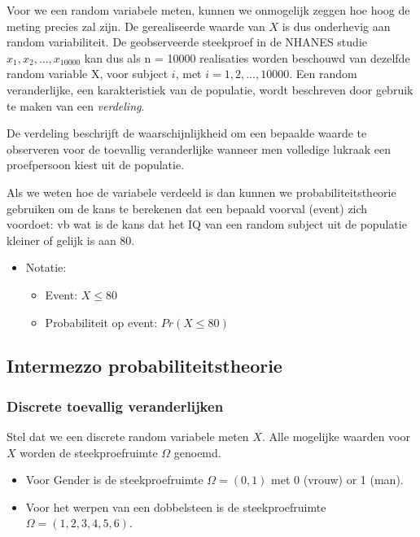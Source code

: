\documentclass[
  12pt,dutch,coursenotes]{book}
\providecommand{\tightlist}{%
  \setlength{\itemsep}{0pt}\setlength{\parskip}{0pt}}
\theoremstyle{definition}
\theoremstyle{definition}
\theoremstyle{definition}
\theoremstyle{remark}
\begin{document}
Voor we een random variabele meten, kunnen we onmogelijk zeggen hoe hoog de meting precies zal zijn.
De gerealiseerde waarde van \(X\) is dus onderhevig aan random variabiliteit.
De geobserveerde steekproef in de NHANES studie \(x_1, x_2, . . . , x_{10000}\) kan dus als n = 10000 realisaties worden beschouwd van dezelfde random variable X, voor subject \(i\), met \(i = 1,2,...,10000\).
Een random veranderlijke, een karakteristiek van de populatie, wordt beschreven door gebruik te maken van een \emph{verdeling}.

De verdeling beschrijft de waarschijnlijkheid om een bepaalde waarde te observeren voor de toevallig veranderlijke wanneer men volledige lukraak een proefpersoon kiest uit de populatie.

Als we weten hoe de variabele verdeeld is dan kunnen we probabiliteitstheorie gebruiken om de kans te berekenen dat een bepaald voorval (event) zich voordoet: vb wat is de kans dat het IQ van een random subject uit de populatie kleiner of gelijk is aan 80.

\begin{itemize}
\item
  Notatie:

  \begin{itemize}
  \tightlist
  \item
    Event: \(X \leq 80\)
  \item
    Probabiliteit op event: \(Pr(X \leq 80)\)
  \end{itemize}
\end{itemize}

\hypertarget{intermezzo-probabiliteitstheorie}{%
\subsection{Intermezzo probabiliteitstheorie}\label{intermezzo-probabiliteitstheorie}}

\hypertarget{discrete-toevallig-veranderlijken}{%
\subsubsection{Discrete toevallig veranderlijken}\label{discrete-toevallig-veranderlijken}}

Stel dat we een discrete random variabele meten \(X\). Alle mogelijke waarden voor \(X\) worden de steekproefruimte \(\Omega\) genoemd.

\begin{itemize}
\item
  Voor Gender is de steekproefruimte \(\Omega=(0,1)\) met 0 (vrouw) or 1 (man).
\item
  Voor het werpen van een dobbelsteen is de steekproefruimte \(\Omega=(1,2,3,4,5,6)\).
\end{itemize}
\end{document}
